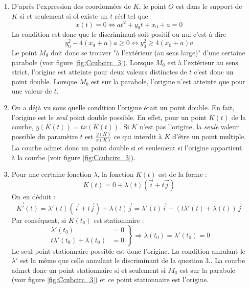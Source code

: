\begin{enumerate}
\item D'après l'expression des coordonnées de $K$, le point $O$ est dans le support de $K$ si et seulement si ol existe un $t$ réel tel que 
\begin{displaymath}
 x(t)=0 \Leftrightarrow at^2 +y_0t +x_0+a=0
\end{displaymath}
La condition est donc que le discriminant soit positif ou nul c'est à dire
\begin{displaymath}
 y_0^2 -4(x_0+a)a \geq 0 \Leftrightarrow y_0^2 \geq 4(x_0+a)a
\end{displaymath}
Le point $M_0$ doit donc se trouver "à l'extérieur (au sens large)" d'une certaine parabole (voir figure \ref{fig:Ccubcirc_3}). Lorsque $M_0$ est à l'extérieur au sens strict, l'origine est atteinte pour deux valeurs distinctes de $t$ c'est donc un point double. Lorsque $M_0$ est sur la parabole, l'origine n'est atteinte que pour une valeur de $t$.
\item On a déjà vu sous quelle condition l'origine était un point double. En fait, l'origine est le \emph{seul} point double possible. En effet, pour un point $K(t)$ de la courbe, $y(K(t))=tx(K(t))$. Si $K$ n'est pas l'origine, la \emph{seule} valeur possible du paramètre $t$ est $\frac{y(K)}{x(K)}$ ce qui interdit à $K$ d'être un point multiple. La courbe admet donc un point double si et seulement si l'origine appartient à la courbe (voir figure \ref{fig:Ccubcirc_3}).
\item Pour une certaine fonction $\lambda$, la fonction $K(t)$ est de la forme :
\begin{displaymath}
 K(t) = 0 +\lambda(t)\left( \overrightarrow{i}+t\overrightarrow{j}\right) 
\end{displaymath}
On en déduit :
\begin{displaymath}
 \overrightarrow{K'}(t) = \lambda'(t)\left( \overrightarrow{i}+t\overrightarrow{j}\right) 
+\lambda(t)\overrightarrow{j}
= \lambda'(t)\overrightarrow{i} + (t\lambda'(t)+\lambda(t))\overrightarrow{j}
\end{displaymath}
Par conséquent, si $K(t_0)$ est stationnaire :
\begin{displaymath}
 \left. 
\begin{aligned}
 \lambda'(t_0) &= 0 \\
t\lambda'(t_0)+\lambda(t_0) &= 0
\end{aligned}
\right\rbrace
\Rightarrow
\lambda(t_0) = \lambda'(t_0) = 0 
\end{displaymath}
Le seul point stationnaire possible est donc l'origine. La condition annulant le $\lambda'$ est la même que celle annulant le discriminant de la question 3.. La courbe admet donc un point stationnaire si et seulement si $M_0$ est sur la parabole (voir figure \ref{fig:Ccubcirc_3}) et ce point stationnaire est l'origine.
\end{enumerate}
